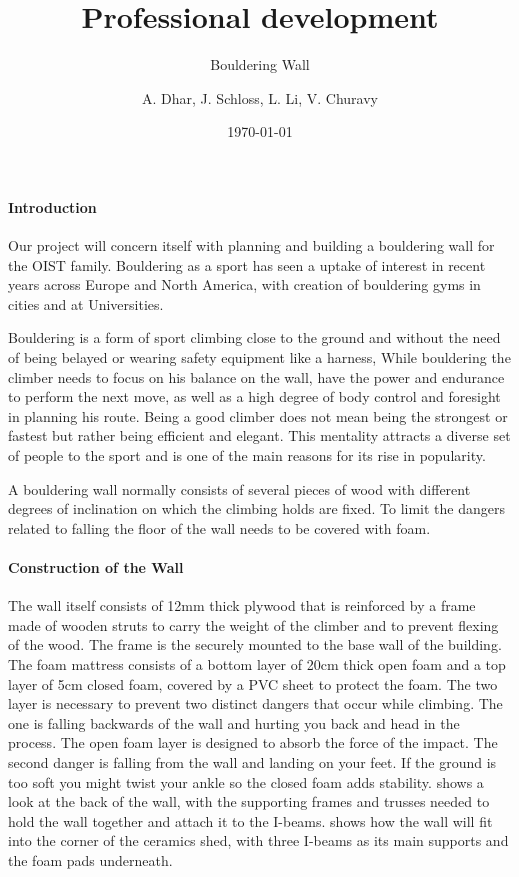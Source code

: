 \documentclass[a4paper, 12pt]{scrartcl}
\date{\today}
\title{Professional development}
\subtitle{Bouldering Wall}
\author{A. Dhar, J. Schloss, L. Li, V. Churavy}
\begin{document}
\maketitle
\paragraph{Introduction}
Our project will concern itself with planning and building a bouldering wall for the OIST family.
Bouldering as a sport has seen a uptake of interest in recent years across Europe and North America, with creation of bouldering gyms in cities and at Universities. 

Bouldering is a form of sport climbing close to the ground and without the need of being belayed or wearing safety equipment like a harness, While bouldering the climber needs to focus on his balance on the wall, have the power and endurance to perform the next move, as well as a high degree of body control and foresight in planning his route. Being a good climber does not mean being the strongest or fastest but rather being efficient and elegant. This mentality attracts a diverse set of people to the sport and is one of the main reasons for its rise in popularity.

A bouldering wall normally consists of several pieces of wood with different degrees of inclination on which the climbing holds are fixed. To limit the dangers related to falling the floor of the wall needs to be covered with foam.

\paragraph{Construction of the Wall}
The wall itself consists of 12mm thick plywood that is reinforced by a frame made of wooden struts to carry the weight of the climber and to prevent flexing of the wood. The frame is the securely mounted to the base wall of the building. 
The foam mattress consists of a bottom layer of 20cm thick open foam and a top layer of 5cm closed foam, covered by a PVC sheet to protect the foam.
The two layer is necessary to prevent two distinct dangers that occur while climbing. The one is falling backwards of the wall and hurting you back and head in the process. The open foam layer is designed to absorb the force of the impact. The second danger is falling from the wall and landing on your feet. If the ground is too soft you might twist your ankle so the closed foam adds stability.
 shows a look at the back of the wall, with the supporting frames and trusses needed to hold the wall together and attach it to the I-beams.  shows how the wall will fit into the corner of the ceramics shed, with three I-beams as its main supports and the foam pads underneath.
\end{document}
